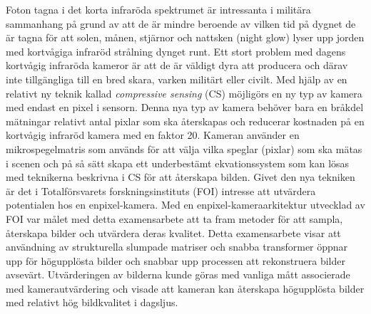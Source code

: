 Foton tagna i det korta infraröda spektrumet är intressanta i militära sammanhang på grund av att de är mindre beroende av vilken tid på dygnet de är tagna för att solen, månen, stjärnor och nattsken (night glow) lyser upp jorden med kortvågiga infraröd strålning dynget runt. Ett stort problem med dagens kortvågig infraröda kameror är att de är väldigt dyra att producera och därav inte tillgängliga till en bred skara, varken militärt eller civilt. Med hjälp av en relativt ny teknik kallad \textit{compressive sensing} (CS) möjligörs en ny typ av kamera med endast en pixel i sensorn. Denna nya typ av kamera behöver bara en bråkdel mätningar relativt antal pixlar som ska återskapas och reducerar kostnaden på en kortvågig infraröd kamera med en faktor 20. Kameran använder en mikrospegelmatris som används för att välja vilka speglar (pixlar) som ska mätas i scenen och på så sätt skapa ett underbestämt ekvationssystem som kan lösas med teknikerna beskrivna i CS för att återskapa bilden. Givet den nya tekniken är det i Totalförsvarets forskningsinstituts (FOI) intresse att utvärdera potentialen hos en enpixel-kamera. Med en enpixel-kameraarkitektur utvecklad av FOI var målet med detta examensarbete att ta fram metoder för att sampla, återskapa bilder och utvärdera deras kvalitet. Detta examensarbete visar att användning av strukturella slumpade matriser och snabba transformer öppnar upp för högupplösta bilder och snabbar upp processen att rekonstruera bilder avsevärt. Utvärderingen av bilderna kunde göras med vanliga mått associerade med kamerautvärdering och visade att kameran kan återskapa högupplösta bilder med relativt hög bildkvalitet i dagsljus. \citep{article:FOI_pres_sens}